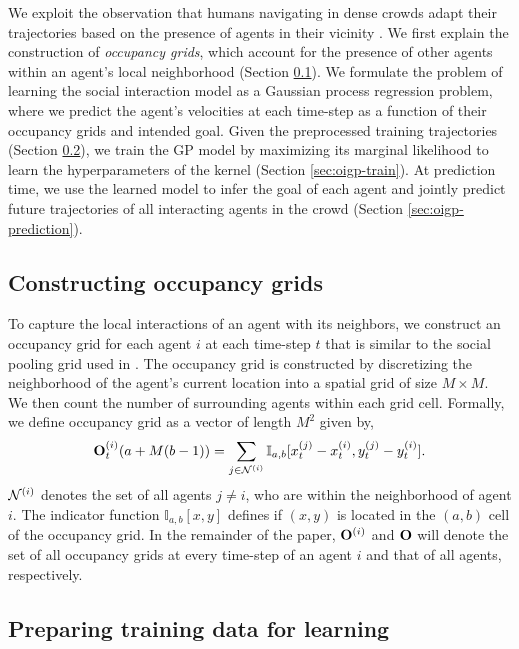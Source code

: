 We exploit the observation that humans navigating in dense crowds
adapt their trajectories based on the presence of agents in their
vicinity \cite{alahi16}.
%
%
%
%
We first explain the construction of \textit{occupancy grids}, which
account for the presence of other agents within an agent's local
neighborhood (Section \ref{sec:oigp-occupancy}).  We formulate the problem
of learning the social interaction model as a Gaussian process
regression problem, where we predict the agent's velocities at each
time-step as a function of their occupancy grids and intended
goal. Given the preprocessed training trajectories (Section
\ref{sec:oigp-preprocessing}), we train the GP model by maximizing its
marginal likelihood to learn the hyperparameters of the kernel
(Section \ref{sec:oigp-train}). At prediction time, we use the learned
model to infer the goal of each agent and jointly predict future
trajectories of all interacting agents in the crowd (Section
\ref{sec:oigp-prediction}).

\subsection{Constructing occupancy grids}
\label{sec:oigp-occupancy}
To capture the local interactions of an agent with its neighbors, we
construct an occupancy grid for each agent $i$ at each time-step $t$
that is similar to the social pooling grid used in \cite{alahi16}. The
occupancy grid is constructed by discretizing the neighborhood of the
agent's current location into a spatial grid of size $M \times M$. We
then count the number of surrounding agents within each grid
cell. Formally, we define occupancy grid as a vector of length $M^2$
given by,
\begin{equation}
  \label{eq:oigp-2}
  \mathbf{O}_t^{(i)} (a + M(b-1)) = \sum_{j \in \mathcal{N}^{(i)}}\mathbb{I}_{a,b}[x_t^{(j)} - x_t^{(i)}, y_t^{(j)} - y_t^{(i)}].
\end{equation}
$\mathcal{N}^{(i)}$ denotes the set of all agents $j \neq i$, who are
within the neighborhood of agent $i$. The indicator function
$\mathbb{I}_{a,b}[x,y]$ defines if $(x,y)$ is located in the $(a,b)$
cell of the occupancy grid.
%
%
In the remainder of the paper, $\mathbf{O}^{(i)}$ and $\mathbf{O}$ will denote
the set of all occupancy grids at every time-step of an agent $i$ and
that of all agents, respectively.
%
%
%

%
\subsection{Preparing training data for learning}
\label{sec:oigp-preprocessing}

